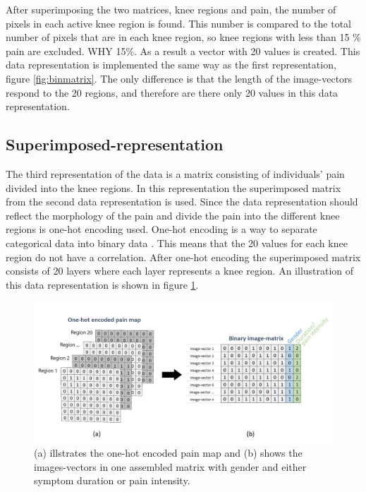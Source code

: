 \noindent
After superimposing the two matrices, knee regions and pain, the number of pixels in each active knee region is found. This number is compared to the total number of pixels that are in each knee region, so knee regions with less than 15 \% pain are excluded. WHY 15\%. As a result a vector with 20 values is created. This data representation is implemented the same way as the first representation, figure \ref{fig:binmatrix}. The only difference is that the length of the image-vectors respond to the 20 regions, and therefore are there only 20 values in this data representation.


\subsection{Superimposed-representation}
The third representation of the data is a matrix consisting of individuals’ pain divided into the knee regions.
\noindent
In this representation the superimposed matrix from the second data representation is used. Since the data representation should reflect the morphology of the pain and divide the pain into the different knee regions is one-hot encoding used. One-hot encoding is a way to separate categorical data into binary data \citep{Harris2012}. This means that the 20 values for each knee region do not have a correlation. After one-hot encoding the superimposed matrix consists of 20 layers where each layer represents a knee region. An illustration of this data representation is shown in figure \ref{fig:onehot}.


\begin{figure} [H]
\centering
\includegraphics[width=1\textwidth]{figures/onehotmatrix}
\caption{(a) illstrates the one-hot encoded pain map and (b) shows the images-vectors in one assembled matrix with gender and either symptom duration or pain intensity.}
\label{fig:onehot}
\end{figure}